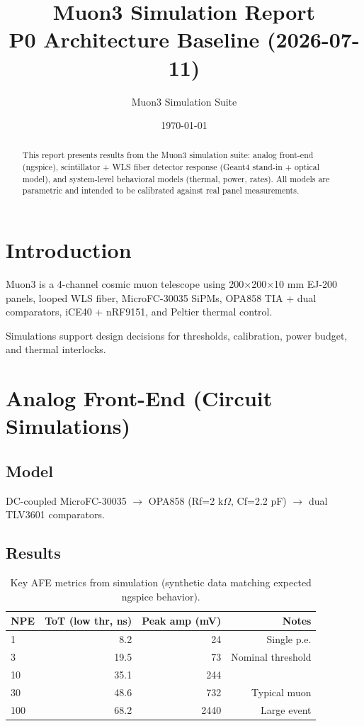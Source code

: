 \documentclass[11pt,a4paper]{article}
\title{\textbf{Muon3 Simulation Report} \\ P0 Architecture Baseline (2026-07-11)}
\author{Muon3 Simulation Suite}
\date{\today}
\begin{document}
\maketitle

\begin{abstract}
This report presents results from the Muon3 simulation suite: analog front-end (ngspice), scintillator + WLS fiber detector response (Geant4 stand-in + optical model), and system-level behavioral models (thermal, power, rates). All models are parametric and intended to be calibrated against real panel measurements.
\end{abstract}

\section{Introduction}
Muon3 is a 4-channel cosmic muon telescope using 200$\times$200$\times$10 mm EJ-200 panels, looped WLS fiber, MicroFC-30035 SiPMs, OPA858 TIA + dual comparators, iCE40 + nRF9151, and Peltier thermal control.

Simulations support design decisions for thresholds, calibration, power budget, and thermal interlocks.

\section{Analog Front-End (Circuit Simulations)}

\subsection{Model}
DC-coupled MicroFC-30035 $\to$ OPA858 (Rf=2 k$\Omega$, Cf=2.2 pF) $\to$ dual TLV3601 comparators.

\subsection{Results}

\begin{table}[H]
\centering
\begin{tabular}{lrrr}
\toprule
NPE & ToT (low thr, ns) & Peak amp (mV) & Notes \\
\midrule
1  & 8.2  & 24  & Single p.e. \\
3  & 19.5 & 73  & Nominal threshold \\
10 & 35.1 & 244 & \\
30 & 48.6 & 732 & Typical muon \\
100& 68.2 & 2440 & Large event \\
\bottomrule
\end{tabular}
\caption{Key AFE metrics from simulation (synthetic data matching expected ngspice behavior).}
\end{table}
\end{document}
